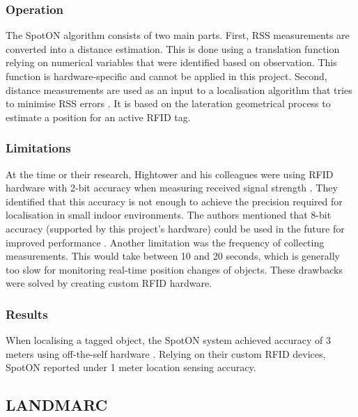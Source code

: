 \subsubsection{Operation}

The SpotON algorithm consists of two main parts. First, RSS measurements are converted into a distance estimation. This is done using a translation function relying on numerical variables that were identified based on observation. This function is hardware-specific and cannot be applied in this project. Second, distance measurements are used as an input to a localisation algorithm that tries to minimise RSS errors \cite{Hightower2000}. It is based on the lateration geometrical process to estimate a position for an active RFID tag.

\subsubsection{Limitations}

At the time or their research, Hightower and his colleagues were using RFID hardware with 2-bit accuracy when measuring received signal strength \cite{Hightower2000}. They identified that this accuracy is not enough to achieve the precision required for localisation in small indoor environments. The authors mentioned that 8-bit accuracy (supported by this project's hardware) could be used in the future for improved performance \cite{Hightower2000}. Another limitation was the frequency of collecting measurements. This would take between 10 and 20 seconds, which is generally too slow for monitoring real-time position changes of objects. These drawbacks were solved by creating custom RFID hardware.

\subsubsection{Results}

When localising a tagged object, the SpotON system achieved accuracy of 3 meters using off-the-self hardware \cite{Hightower2000}. Relying on their custom RFID devices, SpotON reported under 1 meter location sensing accuracy.


\subsection{LANDMARC}

